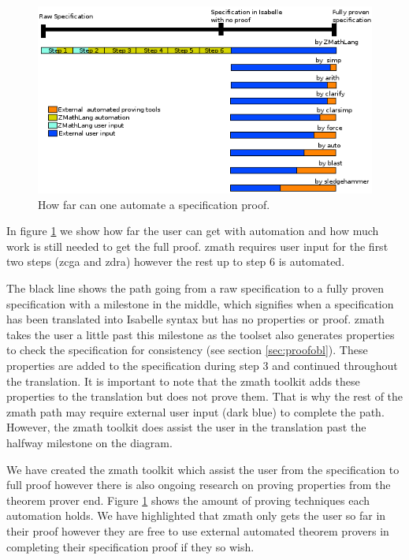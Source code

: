 \begin{figure}[H]
 \begin{center}
 \includegraphics [scale=0.75]{Figures/Design/timeline.png}
 \caption{How far can one automate a specification proof.}
 \label{fig:timeline}
\end{center}
\end{figure} 

In figure \ref{fig:timeline} we show how far the user can get with automation
and how much work is still needed to get the full proof. \Gls{zmath} requires
user input for the first two steps (\gls{zcga} and \gls{zdra}) however the rest
up to step 6 is automated.

The black line shows the path going from a raw specification to a fully proven
specification with a milestone in the middle, which signifies when a
specification has been translated into Isabelle syntax but has no properties or
proof. \Gls{zmath} takes the user a little past this milestone as the toolset
also generates properties to check the specification for consistency (see
section \ref{sec:proofobl}). These properties are added to the specification
during step 3 and continued throughout the translation. It is important to note
that the \gls{zmath} toolkit adds these properties to the translation but does
not prove them. That is why the rest of the \gls{zmath} path may require
external user input (dark blue) to complete the path. However, the \gls{zmath}
toolkit does assist the user in the translation past the halfway milestone on
the diagram.

We have created the \Gls{zmath} toolkit which assist the user from the
specification to full proof however there is also ongoing research on proving
properties from the theorem prover end. Figure \ref{fig:timeline} shows the
amount of proving techniques each automation holds. We have highlighted that
\gls{zmath} only gets the user so far in their proof however they are free to
use external automated theorem provers in completing their specification proof
if they so wish.

